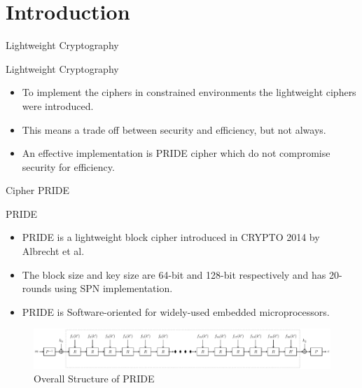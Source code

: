 \section{Introduction}

\begin{frame}{Lightweight Cryptography}
    \begin{block}{Lightweight Cryptography}
        \begin{itemize}
            \item To implement the ciphers in constrained environments the lightweight ciphers were introduced.
            \item This means a trade off between security and efficiency, but not always.
            \item An effective implementation is PRIDE cipher which do not compromise security for efficiency.
        \end{itemize}
    \end{block}
    
\end{frame}

\begin{frame}{Cipher PRIDE}
\begin{block}{PRIDE}
        \begin{itemize}
            \item PRIDE is a lightweight block cipher introduced in CRYPTO 2014 by Albrecht et al.
            \item The block size and key size are 64-bit and 128-bit respectively and has 20-rounds using SPN implementation.
            \item PRIDE is Software-oriented for widely-used embedded microprocessors.
        \end{itemize}
    \end{block}
    \begin{figure}
        \centering
        \includegraphics[width=11.5cm]{structure}
        \caption{Overall Structure of PRIDE}
        \label{fig:1}
    \end{figure}
\end{frame}